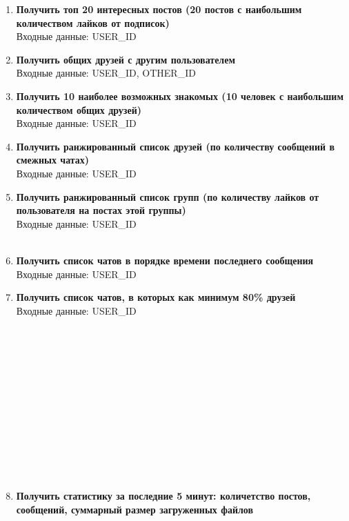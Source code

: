 \documentclass[12pt, a4paper] {ncc}
\begin{document}
\begin{enumerate}

\item \textbf{Получить топ 20 интересных постов (20 постов с наибольшим количеством лайков от подписок)} \\
Входные данные: USER\_ID

\item \textbf{Получить общих друзей с другим пользователем} \\
Входные данные: USER\_ID, OTHER\_ID

\item \textbf{Получить 10 наиболее возможных знакомых (10 человек с наибольшим количеством общих друзей)} \\
Входные данные: USER\_ID \\

\item \textbf{Получить ранжированный список друзей (по количеству сообщений в смежных чатах)} \\
Входные данные: USER\_ID

\item \textbf{Получить ранжированный список групп (по количеству лайков от пользователя на постах этой группы)} \\
Входные данные: USER\_ID \\\\

\item \textbf{Получить список чатов в порядке времени последнего сообщения} \\
Входные данные: USER\_ID

\item \textbf{Получить список чатов, в которых как минимум 80\% друзей} \\
Входные данные: USER\_ID \\\\\\\\\\\\\\\\\\\\\\\\\\

\item \textbf{Получить статистику за последние 5 минут: количетство постов, сообщений, суммарный размер загруженных файлов} \\

\end{enumerate}
\end{document}
